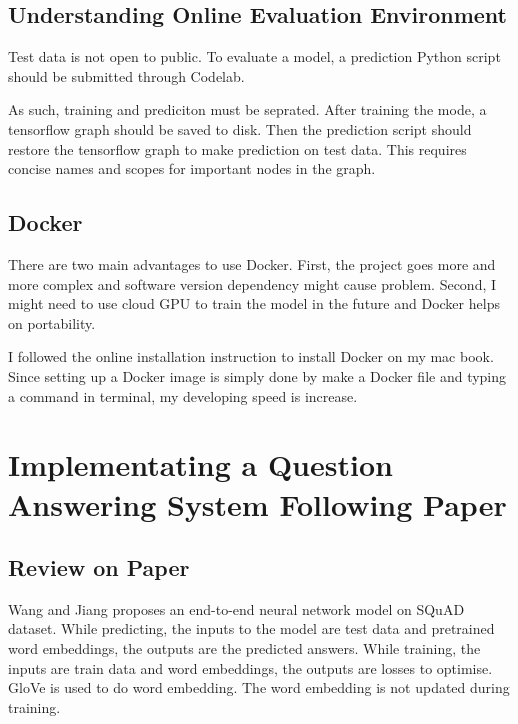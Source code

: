 \documentclass[12pt]{article}
\begin{document}
\subsection{Understanding Online Evaluation Environment}


Test data is not open to public. To evaluate a model, a prediction Python script should be submitted through Codelab.

As such, training and prediciton must be seprated. After training the mode, a tensorflow graph should be saved to disk. Then the prediction script should restore the tensorflow graph to make prediction on test data. This requires concise names and scopes for important nodes in the graph.


\subsection{Docker}

There are two main advantages to use Docker. First, the project goes more and more complex and software version dependency might cause problem. Second, I might need to use cloud GPU to train the model in the future and Docker helps on portability.

I followed the online installation instruction to install Docker on my mac book. Since setting up a Docker image is simply done by make a Docker file and typing a command in terminal, my developing speed is increase.

\break

\section{Implementating a Question Answering System Following
Paper \cite{wang2016machine}}\label{sec:implementpaper}

\subsection{Review on Paper \cite{wang2016machine}}\label{theoreticalModel}

Wang and Jiang \cite{wang2016machine} proposes an end-to-end neural network model on SQuAD dataset. While predicting, the inputs to the model are test data and pretrained word embeddings, the outputs are the predicted answers. While training, the inputs are train data and word embeddings, the outputs are losses to optimise. GloVe is used to do word embedding. The word embedding is not updated during training.
\end{document}

